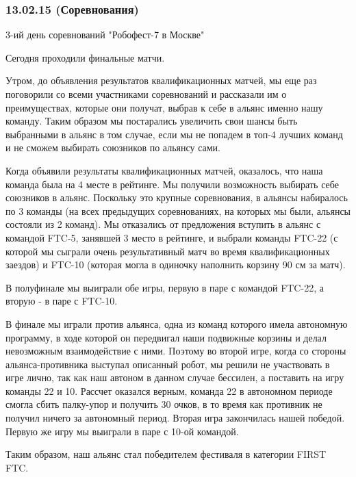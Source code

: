 \subsubsection{13.02.15 (Соревнования)}
\begin{center}
	3-ий день соревнований "Робофест-7 в Москве"
\end{center}
Сегодня проходили финальные матчи.\newline

Утром, до объявления результатов квалификационных матчей, мы еще раз поговорили со всеми участниками соревнований и рассказали им о преимуществах, которые они получат, выбрав к себе в альянс именно нашу команду. Таким образом мы постарались увеличить свои шансы быть выбранными в альянс в том случае, если мы не попадем в топ-4 лучших команд и не сможем выбирать союзников по альянсу сами.\newline

Когда объявили результаты квалификационных матчей, оказалось, что наша команда была на 4 месте в рейтинге. Мы получили возможность выбирать себе союзников в альянс. Поскольку это крупные соревнования, в альянсы набиралось по 3 команды (на всех предыдущих соревнованиях, на которых мы были, альянсы состояли из 2 команд). Мы отказались от предложения вступить в альянс с командой FTC-5, занявшей 3 место в рейтинге, и выбрали команды FTC-22 (с которой мы сыграли очень результативный матч во время квалификационных заездов) и FTC-10 (которая могла в одиночку наполнить корзину 90 см за матч).\newline

В полуфинале мы выиграли обе игры, первую в паре с командой FTC-22, а вторую - в паре с FTC-10.\newline

В финале мы играли против альянса, одна из команд которого имела автономную программу, в ходе которой он передвигал наши подвижные корзины и делал невозможным взаимодействие с ними. Поэтому во второй игре, когда со стороны альянса-противника выступал описанный робот, мы решили не участвовать в игре лично, так как наш автоном в данном случае бессилен, а поставить на игру команды 22 и 10. Рассчет оказался верным, команда 22 в автономном периоде смогла сбить палку-упор и получить 30 очков, в то время как противник не получил ничего за автономный период. Вторая игра закончилась нашей победой. Первую же игру мы выиграли в паре с 10-ой командой.\newline

Таким образом, наш альянс стал победителем фестиваля в категории FIRST FTC.\newline

